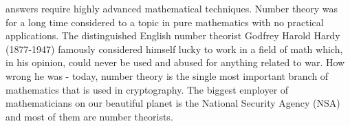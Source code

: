 answers require highly advanced mathematical techniques. Number theory was for a long time considered to a topic in pure mathematics with no practical applications. The distinguished English number theorist Godfrey Harold Hardy (1877-1947) famously considered himself lucky to work in a field of math which, in his opinion, could never be used and abused for anything related to war. How wrong he was - today, number theory is the single most important branch of mathematics that is used in cryptography. The biggest employer of mathematicians on our beautiful planet is the National Security Agency (NSA) and most of them are number theorists.




\begin{comment}
	
Topics:
-Divisibility: Euclidean algo ((ext.) GCD, LCM), Primes, Factorization
-Number Theoretic Functions
 -Prime counting function
 -Moebius function
 -Multiplicativity
-Modular Arithmetic
-Diophantine Equations
 -Fermat's Last Theorem
  -Pythagorean Triples
 -Elliptic Curves
-Algberaic Numbers 
 -Roots of polynomials with coeffs in z, 
  -for Algebraic Integer, the polynomial must be monic
-


where does the Collatz Conjecture fit in? Maybe some sort of "Algorithmic Number Theory" or
"Recursion Theory" or "Recursive Series Theory"? What about the Ackermann function? Or busy beavers? I guess, we are venturing into the realms of theorectical computer science with these.

Resources:
https://en.wikipedia.org/wiki/Number_theory
https://en.wikipedia.org/wiki/Diophantine_equation
https://en.wikipedia.org/wiki/Transcendental_number_theory
https://en.wikipedia.org/wiki/Algebraic_number_theory
https://en.wikipedia.org/wiki/Abc_conjecture
https://en.wikipedia.org/wiki/Elliptic_curve
	
	
https://www.youtube.com/watch?v=DQdgls3f2OM
if (a,b,c) is a Pythagorean triple then (a^m + b^m + c^m) / (a+b+c) is an integer for odd m


https://en.wikipedia.org/wiki/Lagrange%
https://en.wikipedia.org/wiki/Fermat_polygonal_number_theorem
 
https://en.wikipedia.org/wiki/Additive_number_theory
https://en.wikipedia.org/wiki/Partition_(number_theory)
https://en.wikipedia.org/wiki/Multiplicative_number_theory
https://en.wikipedia.org/wiki/Analytic_number_theory
  
	
A Book of Abstract Algebra, pg 349 ff has a nice overview of important facts
	
	
\end{comment}